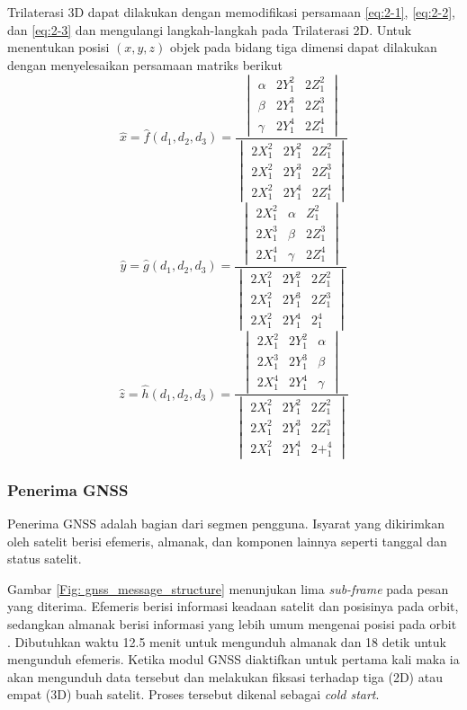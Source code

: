 Trilaterasi 3D dapat dilakukan dengan memodifikasi persamaan \ref{eq:2-1}, \ref{eq:2-2}, dan \ref{eq:2-3} dan mengulangi langkah-langkah pada Trilaterasi 2D. Untuk menentukan posisi $\left(x,y,z\right)$ objek pada bidang tiga dimensi dapat dilakukan dengan menyelesaikan persamaan matriks berikut
$$
\hat{x}=\hat{f}\left(d_1,d_2,d_3\right)=\frac{
	\begin{vmatrix}
		\alpha & 2Y_1^2 & 2Z_1^2\\
		\beta & 2Y_1^3 & 2Z_1^3\\
		\gamma & 2Y_1^4 & 2Z_1^4
\end{vmatrix}}
{
	\begin{vmatrix}
		2X_1^2 & 2Y_1^2 & 2Z_1^2\\
		2X_1^2 & 2Y_1^3 & 2Z_1^3\\
		2X_1^2 & 2Y_1^4 & 2Z_1^4
	\end{vmatrix}
}
$$
$$
\hat{y}=\hat{g}\left(d_1,d_2,d_3\right)=\frac{
	\begin{vmatrix}
		2X_1^2 & \alpha & Z_1^2\\
		2X_1^3 & \beta & 2Z_1^3\\
		2X_1^4 & \gamma & 2Z_1^4
	\end{vmatrix}
}
{
	\begin{vmatrix}
		2X_1^2 & 2Y_1^2 & 2Z_1^2\\
		2X_1^2 & 2Y_1^3 & 2Z_1^3\\
		2X_1^2 & 2Y_1^4 & 2_1^4
	\end{vmatrix}
}
$$
$$\hat{z}=\hat{h}\left(d_1,d_2,d_3\right)=\frac{
	\begin{vmatrix}
		2X_1^2 & 2Y_1^2 & \alpha\\
		2X_1^3 & 2Y_1^3  & \beta\\
		2X_1^4 & 2Y_1^4 & \gamma
\end{vmatrix}}
{
	\begin{vmatrix}
		2X_1^2 & 2Y_1^2 & 2Z_1^2\\
		2X_1^2 & 2Y_1^3 & 2Z_1^3\\
		2X_1^2 & 2Y_1^4 & 2+_1^4
	\end{vmatrix}
}
$$
\subsubsection{Penerima GNSS}
Penerima GNSS adalah bagian dari segmen pengguna. Isyarat yang dikirimkan oleh satelit berisi efemeris, almanak, dan komponen lainnya seperti tanggal dan status satelit.

Gambar \ref{Fig: gnss_message_structure} menunjukan lima \textit{sub-frame} pada pesan yang diterima. Efemeris berisi informasi keadaan satelit dan posisinya pada orbit, sedangkan almanak berisi informasi yang lebih umum mengenai posisi pada orbit \cite{Lenhart2022}. Dibutuhkan waktu 12.5 menit untuk mengunduh almanak dan 18 detik untuk mengunduh efemeris. Ketika modul GNSS diaktifkan untuk pertama kali maka ia akan mengunduh data tersebut dan melakukan fiksasi terhadap tiga (2D) atau empat (3D) buah satelit. Proses tersebut dikenal sebagai \textit{cold start}. 

